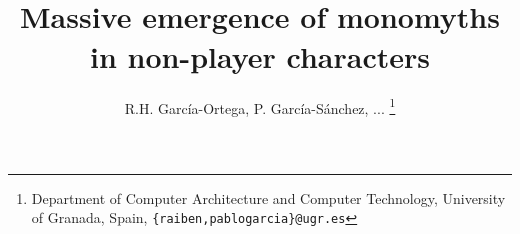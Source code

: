 \documentclass[conference]{IEEEtran}
\begin{document}

\title{\ \\ \LARGE\bf Massive emergence of monomyths in non-player
  characters}

\author{R.H. Garc\'ia-Ortega, P. Garc\'ia-S\'anchez, ... \thanks{Department of Computer Architecture and Computer Technology, University of Granada, Spain, {\tt \{raiben,pablogarcia\}@ugr.es}}}

\maketitle
\end{document}
